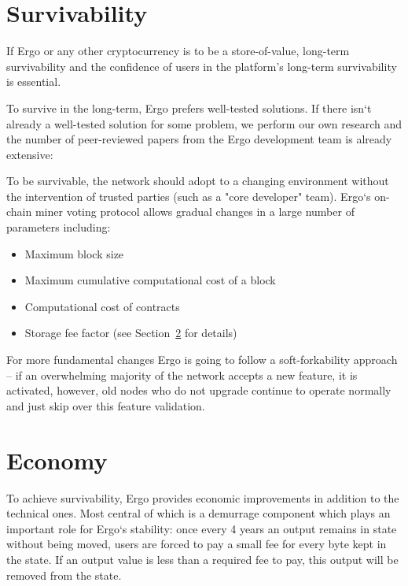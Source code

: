 \documentclass[]{article}
\begin{document}
    \section{Survivability}

    If Ergo or any other cryptocurrency is to be a store-of-value, long-term survivability and the
    confidence of users in the platform’s long-term survivability is essential.

    To survive in the long-term, Ergo prefers well-tested solutions. If there isn`t already a well-tested
    solution for some problem, we perform our own research and the number of peer-reviewed
    papers from the Ergo development team is already extensive:~\cite{reyzin2017improving,meshkov2017short,chepurnoy2018systematic,chepurnoy2018self,chepurnoy2018checking,duong2018multi}

    To be survivable, the network should adopt to a changing environment without the intervention
    of trusted parties (such as a "core developer" team). Ergo`s on-chain miner voting protocol
    allows gradual changes in a large number of parameters including:

    \begin{itemize}
        \item Maximum block size
        \item Maximum cumulative computational cost of a block
        \item Computational cost of contracts
        \item Storage fee factor (see Section~\ref{sec:economy} for details)
    \end{itemize}

    For more fundamental changes Ergo is going to follow a soft-forkability approach -- if an
    overwhelming majority of the network accepts a new feature, it is activated, however, old nodes
    who do not upgrade continue to operate normally and just skip over this feature validation.

    \section{Economy}
    \label{sec:economy}

    To achieve survivability, Ergo provides economic improvements in addition to the technical
    ones. Most central of which is a demurrage component which plays an important role for Ergo`s
    stability: once every 4 years an output remains in state without being moved, users are forced to
    pay a small fee for every byte kept in the state. If an output value is less than a required fee to
    pay, this output will be removed from the state.
\end{document}
